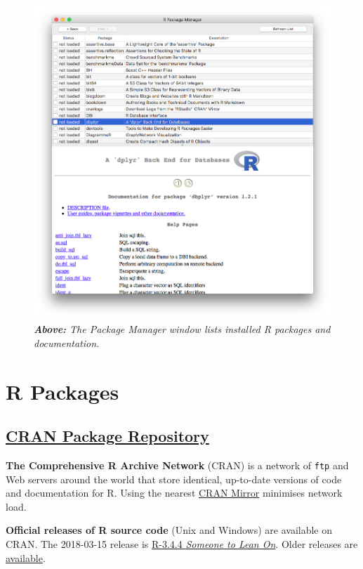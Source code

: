 \documentclass[]{book}
\theoremstyle{definition}
\theoremstyle{definition}
\theoremstyle{definition}
\theoremstyle{remark}
\begin{document}
\begin{figure}
\centering
\includegraphics{images/R_Package_Manager.png}
\caption{\emph{\textbf{Above:} The Package Manager window lists
installed R packages and documentation.}}
\end{figure}

\hypertarget{r-packages}{%
\section{R Packages}\label{r-packages}}

\hypertarget{cran-package-repository}{%
\subsection{\texorpdfstring{\href{https://cran.r-project.org/}{CRAN
Package
Repository}}{CRAN Package Repository}}\label{cran-package-repository}}

\textbf{The Comprehensive R Archive Network} (CRAN) is a network of
\texttt{ftp} and Web servers around the world that store identical,
up-to-date versions of code and documentation for R. Using the nearest
\href{https://cran.r-project.org/}{CRAN Mirror} minimises network load.

\textbf{Official releases of R source code} (Unix and Windows) are
available on CRAN. The 2018-03-15 release is
\href{https://cran.r-project.org/src/base/R-3/R-3.4.4.tar.gz}{R-3.4.4
\emph{Someone to Lean On}}. Older releases are
\href{https://cran.r-project.org/src/base/}{available}.
\end{document}
